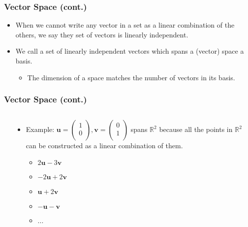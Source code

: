 \documentclass[pdflatex, 12pt]{beamer}
\newcommand{\R}{\mathbb{R}}
\begin{document}
\begin{frame}
\frametitle{Vector Space (cont.)}
\begin{itemize}
\item When we cannot write any vector in a set as a linear combination of the others, we say they set of vectors is {\color{red} linearly independent}.
\vspace{0.4cm}
\item We call a set of linearly independent vectors which spans a (vector) space a {\color{red} basis}.
 \begin{itemize}
 \item The dimension of a space matches the number of vectors in its basis. 
 \end{itemize}
\end{itemize}
\end{frame}

\begin{frame}
\frametitle{Vector Space (cont.)}
\begin{columns}
\begin{column}{0.5\textwidth}
\centering
{}
\end{column}
\begin{column}{0.5\textwidth}
\begin{itemize}
\item Example: $\bm{u} = \begin{pmatrix}
1 \\
0 \\
\end{pmatrix}, \bm{v} = \begin{pmatrix}
0 \\
1 \\
\end{pmatrix}$ spans $\R^2$ because all the points in $\R^2$ can be constructed as a linear combination of them.
 \begin{itemize}
 \item $2\bm{u} - 3\bm{v}$
 \item $-2\bm{u} + 2\bm{v}$
 \item $\bm{u} + 2\bm{v}$
 \item $-\bm{u} - \bm{v}$
 \item ...
 \end{itemize}
\end{itemize}
\end{column}
\end{columns}
\end{frame}
\end{document}
